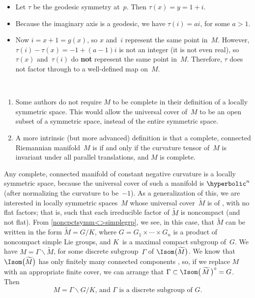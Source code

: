 \begin{eg}
\begin{enumerate}
\begin{itemize}
 \item Let $\tau$ be the geodesic symmetry at~$p$. Then $\tau(x) = y
= 1 + i$.
 \item Because the imaginary axis is a geodesic, we have $\tau(i) =
ai$, for some $a > 1$.
 \item Now $i = x + 1 = g(x)$, so $x$ and~$i$ represent the same point
in~$M$. However, $\tau(i) - \tau(x) = -1 + (a-1)i$ is not an
integer (it is not even real), so $\tau(x)$ and~$\tau(i)$ do
\textbf{not} represent the same point in~$M$.  Therefore, $\tau$ does not
factor through to a well-defined map on~$M$.
 \end{itemize}

 \end{enumerate}
 \end{eg}

 \begin{rems} \ \label{locsymm<>curv}
 \noprelistbreak
 \begin{enumerate}
 \item Some authors do not require $M$ to be complete in their
definition of a locally symmetric space. This would allow the
universal cover of~$M$ to be an open subset of a symmetric space,
instead of the entire symmetric space.
 \item A more intrinsic (but more advanced) definition is that a
complete, connected Riemannian manifold~$M$ is  if and only if the curvature tensor of~$M$ is invariant
under all parallel translations, and $M$ is complete. 
 \end{enumerate}
 \end{rems}

Any complete, connected manifold of constant negative curvature is a
locally symmetric space, because the universal cover of such a manifold is $\hyperbolic^n$  (after normalizing the curvature to be~$-1$).
As a generalization of this, we are interested in locally symmetric
spaces~$M$ whose universal cover~$\widetilde{M}$ is of
, with no flat factors; that is, such that
each irreducible factor of $\widetilde{M}$ is noncompact (and not
flat).  From \cref{noncpctsymm<>simplegrp}, we see, in this
case, that $\widetilde{M}$ can be written in the form $\widetilde{M} = 
G/K$, where $G = G_1 \times \cdots \times G_n$ is a product of
noncompact simple Lie groups, and $K$~is a maximal compact subgroup
of~$G$. We have $M = \Gamma \backslash \widetilde{M}$, for some discrete subgroup~$\Gamma$ of $\Isom \bigl(  \widetilde{M}  \bigr)$. We know that $\Isom \bigl(  \widetilde{M} \bigr)$ has only finitely many connected components , so, if we replace $M$ with an appropriate finite cover, we can arrange that $\Gamma \subset \Isom \bigl( \, \widetilde{M} \, \bigr)^\circ = G$. Then
	$$ \text{$M = \Gamma \backslash G/K$, and $\Gamma$~is a discrete subgroup of~$G$.} $$

